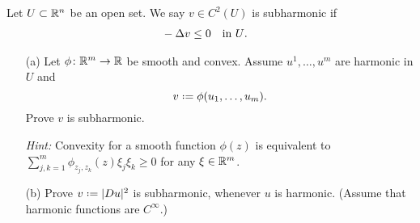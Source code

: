 \begin{problem}
  Let \(U\subset\mathbb{R}^n\) be an open set. We say \(v \in C^2(U)\) is
  subharmonic if
  \[
    \begin{aligned}
      &-\Delta v\leq 0&&\text{in \(U\).}
    \end{aligned}
  \]
  \begin{itemize}
  \item[(a)] Let \(\phi\colon\R^m\to\R\) be smooth and
    convex. Assume \(u^1,\dotsc,u^m\) are harmonic in \(U\) and
    \[
      v\defeq\phi(u_1,\dotsc,u_m).
    \]
    Prove \(v\) is subharmonic.

    \noindent\emph{Hint:} Convexity for a smooth function \(\phi(z)\) is
    equivalent to \(\sum_{j,k=1}^m\phi_{z_j,z_k}(z)\xi_j\xi_k\geq 0\)
    for any \(\xi\in\mathbb{R}^m\).
  \item[(b)] Prove \(v\defeq|Du|^2\) is subharmonic, whenever \(u\) is
    harmonic. (Assume that harmonic functions are \(C^\infty\).)
  \end{itemize}
\end{problem}
